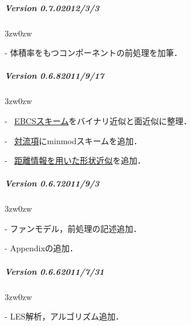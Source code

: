 
{\small

%
\subparagraph{Version 0.7.0\hspace{1cm}2012/3/3}

\begin{description}
\begin{indentation}{3zw}{0zw}
\item[-] 体積率をもつコンポーネントの前処理を加筆．
\end{indentation}
\end{description}
\vspace{3mm}

%
\subparagraph{Version 0.6.8\hspace{1cm}2011/9/17}

\begin{description}
\begin{indentation}{3zw}{0zw}
\item[-] {}~\hyperlink{tgt:ebcs}{EBCSスキーム}をバイナリ近似と面近似に整理．
\item[-] {}~\hyperlink{tgt:convection term}{対流項}にminmodスキームを追加．
\item[-] {}~\hyperlink{tgt:dist_info_scheme}{距離情報を用いた形状近似}を追加．
\end{indentation}
\end{description}
\vspace{3mm}

%
\subparagraph{Version 0.6.7\hspace{1cm}2011/9/3}

\begin{description}
\begin{indentation}{3zw}{0zw}
\item[-] ファンモデル，前処理の記述追加．
\item[-] Appendixの追加．
\end{indentation}
\end{description}
\vspace{3mm}

%
\subparagraph{Version 0.6.6\hspace{1cm}2011/7/31}

\begin{description}
\begin{indentation}{3zw}{0zw}
\item[-] LES解析，アルゴリズム追加．
\end{indentation}
\end{description}
\vspace{3mm}

}

